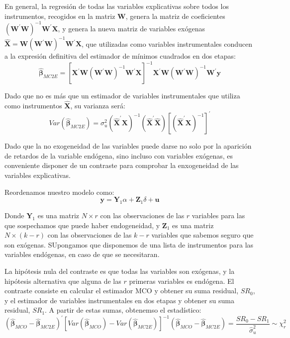 En general, la regresi\'on de todas las variables explicativas sobre todos los instrumentos, recogidos en la matriz $\boldsymbol{W}$, genera la matriz de coeficientes $\left(\boldsymbol{W}^{\prime}\boldsymbol{W}\right)^{-1}\boldsymbol{W}^{\prime}\boldsymbol{X}$, y genera la nueva matriz de variables ex\'ogenas $\hat{\boldsymbol{X}}=\boldsymbol{W}\left(\boldsymbol{W}^{\prime}\boldsymbol{W}\right)^{-1}\boldsymbol{W}^{\prime}\boldsymbol{X}$, que utilizadas como variables instrumentales conducen a la expresi\'on definitiva del estimador de m\'inimos cuadrados en dos etapas:
\[\hat{\boldsymbol{\beta}}_{MC2E}=\left[\boldsymbol{X}^{\prime}\boldsymbol{W}\left(\boldsymbol{W}^{\prime}\boldsymbol{W}\right)^{-1}\boldsymbol{W}^{\prime}\boldsymbol{X}\right]^{-1}\boldsymbol{X}^{\prime}\boldsymbol{W}\left(\boldsymbol{W}^{\prime}\boldsymbol{W}\right)^{-1}\boldsymbol{W}^{\prime}\boldsymbol{y}\]

Dado que no es m\'as que un estimador de variables instrumentales que utiliza como instrumentos $\hat{\boldsymbol{X}}$, su varianza ser\'a:
\[Var\left(\hat{\boldsymbol{\beta}}_{MC2E}\right)=\sigma_u^2\left(\hat{\boldsymbol{X}}^{\prime}\boldsymbol{X}\right)^{-1}\left(\hat{\boldsymbol{X}}^{\prime}\hat{\boldsymbol{X}}\right)\left[\left(\hat{\boldsymbol{X}}^{\prime}\boldsymbol{X}\right)^{-1}\right]^{\prime}\]


Dado que la no exogeneidad de las variables puede darse no solo por la aparici\'on de retardos de la variable end\'ogena, sino incluso con variables ex\'ogenas, es conveniente disponer de un contraste para comprobar la enxogeneidad de las variables explicativas.

Reordenamos nuestro modelo como:
\[\boldsymbol{y}=\boldsymbol{Y}_1\alpha+\boldsymbol{Z}_1\delta+\boldsymbol{u}\]

Donde $\boldsymbol{Y}_1$ es una matriz $N\times r$ con las observaciones de las $r$ variables para las que sospechamos que puede haber endogeneidad, y $\boldsymbol{Z}_1$ es una matriz $N\times (k-r)$ con las observaciones de las $k-r$ variables que sabemos seguro que son ex\'ogenas. SUpongamos que disponemos de una lista de instrumentos para las variables end\'ogenas, en caso de que se necesitaran.

La hip\'otesis nula del contraste es que todas las variables son ex\'ogenas, y la hip\'otesis alternativa que alguna de las $r$ primeras variables es end\'ogena. El contraste consiste en calcular el estimador MCO y obtener su suma residual, $SR_0$, y el estimador de variables instrumentales en dos etapas y obtener su suma residual, $SR_1$. A partir de estas sumas, obtenemso el estad\'istico:
\[\left(\hat{\boldsymbol{\beta}}_{MCO}-\hat{\boldsymbol{\beta}}_{MC2E}\right)^{\prime}\left[Var\left(\hat{\boldsymbol{\beta}}_{MCO}\right)-Var\left(\hat{\boldsymbol{\beta}}_{MC2E}\right)\right]^{-1}\left(\hat{\boldsymbol{\beta}}_{MCO}-\hat{\boldsymbol{\beta}}_{MC2E}\right)=\dfrac{SR_0-SR_1}{\hat{\sigma}_u^2}\sim\chi^2_{r}\]


